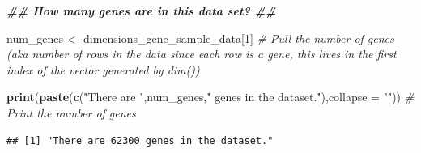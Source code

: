 \documentclass[
]{article}
\newenvironment{Shaded}{\begin{snugshade}}{\end{snugshade}}
\newcommand{\AttributeTok}[1]{\textcolor[rgb]{0.13,0.29,0.53}{#1}}
\newcommand{\CommentTok}[1]{\textcolor[rgb]{0.56,0.35,0.01}{\textit{#1}}}
\newcommand{\DecValTok}[1]{\textcolor[rgb]{0.00,0.00,0.81}{#1}}
\newcommand{\DocumentationTok}[1]{\textcolor[rgb]{0.56,0.35,0.01}{\textbf{\textit{#1}}}}
\newcommand{\FunctionTok}[1]{\textcolor[rgb]{0.13,0.29,0.53}{\textbf{#1}}}
\newcommand{\NormalTok}[1]{#1}
\newcommand{\OtherTok}[1]{\textcolor[rgb]{0.56,0.35,0.01}{#1}}
\newcommand{\StringTok}[1]{\textcolor[rgb]{0.31,0.60,0.02}{#1}}
\begin{document}
\begin{Shaded}
\begin{Highlighting}[]
\DocumentationTok{\#\# How many genes are in this data set? \#\#}

\NormalTok{num\_genes }\OtherTok{\textless{}{-}}\NormalTok{ dimensions\_gene\_sample\_data[}\DecValTok{1}\NormalTok{] }\CommentTok{\# Pull the number of genes (aka number of rows in the data since each row is a gene, this lives in the first index of the vector generated by dim())}

\FunctionTok{print}\NormalTok{(}\FunctionTok{paste}\NormalTok{(}\FunctionTok{c}\NormalTok{(}\StringTok{"There are "}\NormalTok{,num\_genes,}\StringTok{" genes in the dataset."}\NormalTok{),}\AttributeTok{collapse =} \StringTok{""}\NormalTok{)) }\CommentTok{\# Print the number of genes }
\end{Highlighting}
\end{Shaded}

\begin{verbatim}
## [1] "There are 62300 genes in the dataset."
\end{verbatim}
\end{document}
